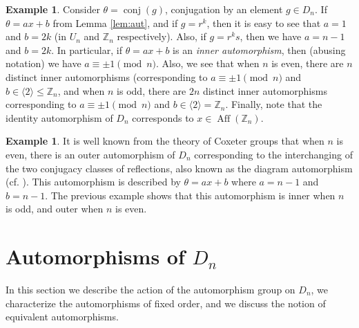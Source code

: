 \documentclass[12pt]{amsart}
\numberwithin{equation}{section}
\theoremstyle{definition}
\newtheorem{example}[theorem]{Example}
\newcommand{\Aff}{\operatorname{Aff}}
\newcommand{\Z}{\mathbb{Z}}
\newcommand{\autconj}{\operatorname{conj}}
\renewcommand{\Z}{\mathbb{Z}}
\begin{document}
\begin{example}
  Consider $\theta = \autconj(g)$,
  conjugation by an element $g\in D_n$. 
  If $\theta = ax + b$ from Lemma \ref{lem:aut}, and
  if $g=r^k$, then it is easy to see that $a=1$ and
  $b=2k$ (in $U_n$ and $\Z_n$ respectively). Also, if $g=r^ks$, then we have $a=n-1$ and
  $b=2k$. In particular, if $\theta=ax+b$ is an \emph{inner automorphism},
  then (abusing notation) we have $a\equiv\pm 1 \pmod{n}$. Also, we see that when $n$ is even, there are $n$
  distinct inner automorphisms (corresponding to $a\equiv\pm 1\pmod{n}$ and $b\in\langle2\rangle\leq
  \Z_n$, and when $n$ is odd, there are $2n$ distinct inner automorphisms
  corresponding to $a\equiv\pm 1\pmod{n}$ and $b\in\langle2\rangle=\Z_n$.  Finally, note
  that the identity automorphism of $D_n$
  corresponds to $x \in \Aff(\Z_n)$.
\end{example}

\begin{example}
\label{coxeter-example}
  It is well known from the theory of Coxeter groups that when $n$ is
  even, there is an outer automorphism of $D_n$ corresponding to the
  interchanging of the two conjugacy classes of reflections, also
  known as the diagram automorphism (cf. \cite[\S4.2]{Bourbaki}). This
  automorphism is described by $\theta=ax+b$ where $a=n-1$ and
  $b=n-1$. The previous example shows that this automorphism
  is inner when $n$ is odd, and outer when $n$ is even.
\end{example}


\section{Automorphisms of $D_n$}
\label{sec:aut}

In this section we describe the action of the automorphism group on
$D_n$, we characterize the automorphisms of fixed order, and we discuss the notion of equivalent automorphisms. 
\end{document}
